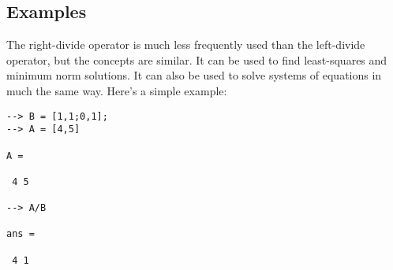 \subsection{Examples}

The right-divide operator is much less frequently used than the left-divide operator, but the concepts are similar.  It can be used to find least-squares and minimum norm solutions.  It can also be used to solve systems of equations in much the same way.  Here's a simple example:
\begin{verbatim}
--> B = [1,1;0,1];
--> A = [4,5]

A = 

 4 5 

--> A/B

ans = 

 4 1 
\end{verbatim}

